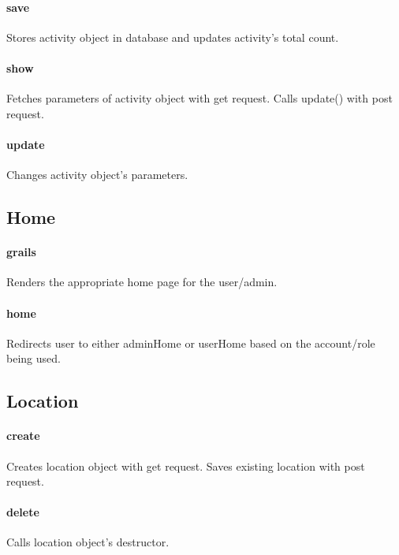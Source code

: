 \documentclass[12pt]{article}
\begin{document}
\paragraph{save} Stores activity object in database and updates activity's total count.
\paragraph{show} Fetches parameters of activity object with get request. Calls update() with post request.
\paragraph{update} Changes activity object's parameters.

\subsection{Home}\label{sec:CHome}
\paragraph{grails} Renders the appropriate home page for the user/admin.
\paragraph{home} Redirects user to either adminHome or userHome based on the account/role being used.

\subsection{Location}\label{sec:CLocation}
\paragraph{create} Creates location object with get request. Saves existing location with post request.
\paragraph{delete} Calls location object's destructor.
\end{document}
